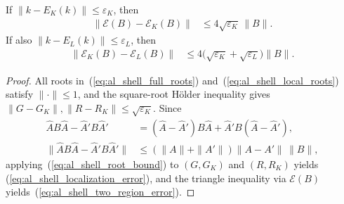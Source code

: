 \begin{lemma}
    \label{thm:al_root_channel_error}
    \leanok
    If $\|k-E_K(k)\|\le\varepsilon_K$, then
    \begin{align}
        \|\mathcal E(B)-\mathcal E_K(B)\|
         & \le4\sqrt{\varepsilon_K}\,\|B\|.
        \label{eq:al_shell_localization_error}
    \end{align}
    If also $\|k-E_L(k)\|\le\varepsilon_L$, then
    \begin{align}
        \|\mathcal E_K(B)-\mathcal E_L(B)\|
         & \le4\bigl(\sqrt{\varepsilon_K}+\sqrt{\varepsilon_L}\bigr)\|B\|.
        \label{eq:al_shell_two_region_error}
    \end{align}
\end{lemma}
\begin{proof}
    \leanok
    All roots in~(\ref{eq:al_shell_full_roots})
    and~(\ref{eq:al_shell_local_roots}) satisfy $\|\cdot\|\le1$, and the
    square-root H\"older inequality gives
    $\|G-G_K\|,\|R-R_K\|\le\sqrt{\varepsilon_K}$. Since
    \begin{align}
        \widehat A B\widehat A-\widehat A'B\widehat A'
         & =(\widehat A-\widehat A')B\widehat A
        +\widehat A'B(\widehat A-\widehat A'),
        \label{eq:al_shell_root_difference}     \\
        \|\widehat A B\widehat A-\widehat A'B\widehat A'\|
         & \le(\|A\|+\|A'\|)\|A-A'\|\,\|B\|,
        \label{eq:al_shell_root_bound}
    \end{align}
    applying~(\ref{eq:al_shell_root_bound}) to $(G,G_K)$ and $(R,R_K)$ yields
    (\ref{eq:al_shell_localization_error}), and the triangle inequality via
    $\mathcal E(B)$ yields~(\ref{eq:al_shell_two_region_error}).
\end{proof}

